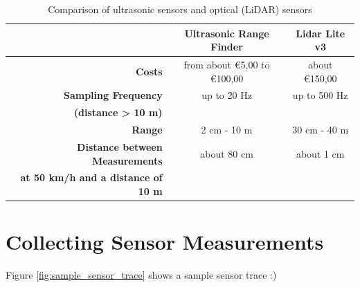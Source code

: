 \begin{table}

\bgroup
\def\arraystretch{1.5}
\begin{tabular}{| r || c | c |}
\hline
   & 
   \textbf{Ultrasonic Range Finder} & 
   \textbf{Lidar Lite v3} \\
\hline
  \textbf{Costs} & 
   from about \euro{5,00} to \euro{100,00} &
   about \euro{150,00} \\
\hline
  \textbf{Sampling Frequency} & 
   up to 20 Hz &
   up to 500 Hz \\
  \textbf{(distance > 10 m)} & & \\
\hline
  \textbf{Range} & 
   2 cm - 10 m &
   30 cm - 40 m \\
\hline
  \textbf{Distance between Measurements} & 
   about 80 cm &
   about 1 cm \\
  \textbf{at 50 km/h and a distance of 10 m} & & \\
\hline

\end{tabular}
\egroup

\caption{Comparison of ultrasonic sensors and optical (LiDAR) sensors}
\label{table:comparison_us_lidar}
\end{table}







%
%
%


\section{Collecting Sensor Measurements}

Figure \ref{fig:sample_sensor_trace} shows a sample sensor trace :)

